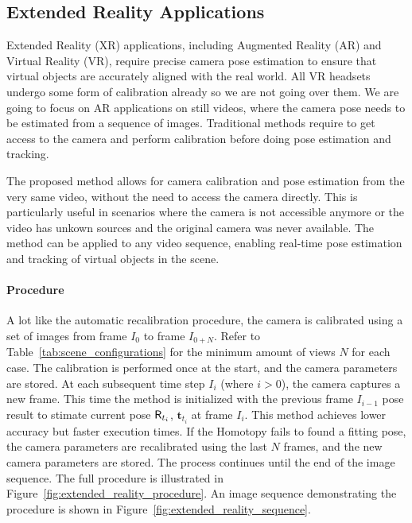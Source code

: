 \subsection{Extended Reality Applications}
\label{sec:extended_reality}

Extended Reality (XR) applications, including Augmented Reality (AR) and Virtual Reality (VR), require precise camera pose estimation to ensure that virtual objects are accurately aligned with the real world. All VR headsets undergo some form of calibration already so we are not going over them. We are going to focus on AR applications on still videos, where the camera pose needs to be estimated from a sequence of images. Traditional methods require to get access to the camera and perform calibration before doing pose estimation and tracking.

The proposed method allows for camera calibration and pose estimation from the very same video, without the need to access the camera directly. This is particularly useful in scenarios where the camera is not accessible anymore or the video has unkown sources and the original camera was never available. The method can be applied to any video sequence, enabling real-time pose estimation and tracking of virtual objects in the scene.

\paragraph{Procedure}
A lot like the automatic recalibration procedure, the camera is calibrated using a set of images from frame $I_0$ to frame $I_{0+N}$. Refer to Table~\ref{tab:scene_configurations} for the minimum amount of views $N$ for each case. The calibration is performed once at the start, and the camera parameters are stored. At each subsequent time step $I_i$ (where $i > 0$), the camera captures a new frame. This time the method is initialized with the previous frame $I_{i-1}$ pose result to stimate current pose $\mathsf{R}_{t_i}$, $\mathbf{t}_{t_i}$ at frame $I_i$. This method achieves lower accuracy but faster execution times. If the Homotopy fails to found a fitting pose, the camera parameters are recalibrated using the last $N$ frames, and the new camera parameters are stored. The process continues until the end of the image sequence. The full procedure is illustrated in Figure~\ref{fig:extended_reality_procedure}. An image sequence demonstrating the procedure is shown in Figure~\ref{fig:extended_reality_sequence}.

